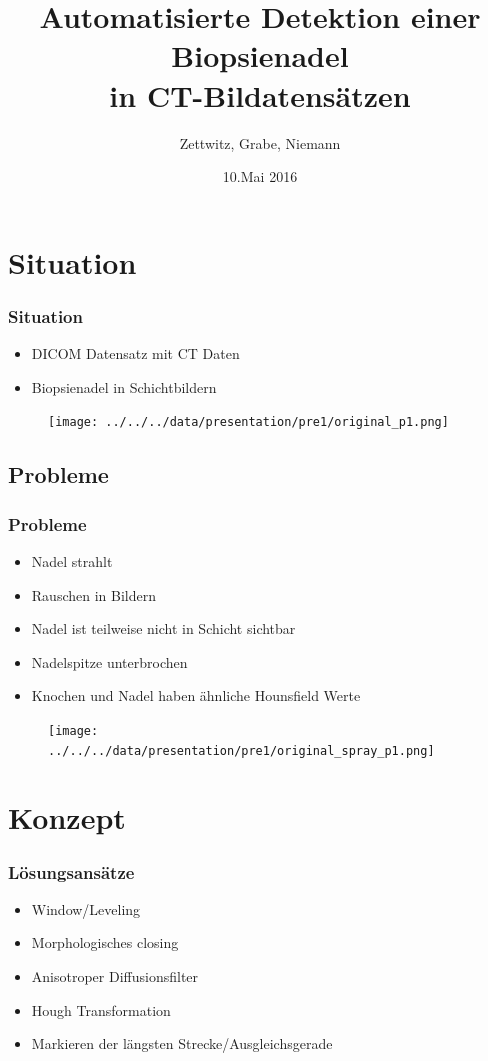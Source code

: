 \documentclass[11pt]{beamer}
\author{Zettwitz, Grabe, Niemann}
\title{Automatisierte Detektion einer Biopsienadel \\ in CT-Bildatensätzen}
\date{10.Mai 2016}
\begin{document}
\begin{frame}
\titlepage
\end{frame}


\section{Situation}
\begin{frame}
\frametitle{Situation}
\begin{itemize} 
\item DICOM Datensatz mit CT Daten
\item Biopsienadel in Schichtbildern
\end{itemize}

\begin{figure}[H]
\texttt{[image: ../../../data/presentation/pre1/original\_p1.png]}
\end{figure} 
\end{frame}


\subsection{Probleme}
\begin{frame}
\frametitle{Probleme}
\begin{itemize}
\item Nadel strahlt
\item Rauschen in Bildern
\item Nadel ist teilweise nicht in Schicht sichtbar
\item Nadelspitze unterbrochen
\item Knochen und Nadel haben ähnliche Hounsfield Werte
\end{itemize}

\begin{figure}[H]
\texttt{[image: ../../../data/presentation/pre1/original\_spray\_p1.png]}
\end{figure} 
\end{frame}

\section{Konzept}
\begin{frame}
\frametitle{Lösungsansätze}
\begin{itemize}
\item Window/Leveling
\item Morphologisches closing
\item Anisotroper Diffusionsfilter
\item Hough Transformation
\item Markieren der längsten Strecke/Ausgleichsgerade
\end{itemize}
\end{frame}
\end{document}
